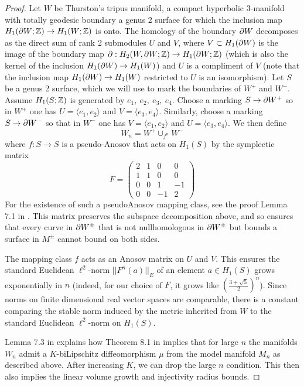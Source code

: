 \begin{proof}
Let $W$ be Thurston’s tripus manifold, a compact hyperbolic 3-manifold with totally geodesic boundary a genus 2 surface for which the inclusion map $H_1(\partial W;{\mathbb Z})\to H_1(W;{\mathbb Z})$ is onto.
The homology of the boundary $\partial W$ decomposes as the direct sum of rank 2 submodules $U$ and $V$, where $V\subset H_1(\partial W)$ is the image of the boundary map $\partial : H_2(W,\partial W;{\mathbb Z})\to H_1(\partial W;{\mathbb Z})$ (which is also the kernel of the inclusion $H_1(\partial W)\to H_1(W)$) and $U$ is a compliment of $V$ (note that the inclusion map $H_1(\partial W)\to H_1(W)$ restricted to $U$ is an isomorphism).
Let $S$ be a genus 2 surface, which we will use to mark the boundaries of $W^{+}$ and $W^-$. Assume $H_1(S;{\mathbb Z})$ is generated by $e_1,~e_2,~e_3,~e_4$. Choose a marking $S\to \partial W^+$ so in $W^+$ one has $U = \langle e_1,e_2\rangle $ and $V = \langle e_3, e_4\rangle$.
Similarly, choose a marking $S\to \partial W^-$ so that in $W^-$ one has $V = \langle e_1,e_2\rangle $ and $U = \langle e_3, e_4\rangle$. We then define $$W_n = W^+\cup_{f^n}W^-$$ where $f:S\to S$ is a pseudo-Anosov that acts on $H_1(S)$ by the symplectic matrix\[ F = \begin{pmatrix}
 2 &  1 & 0 & 0 \\
 1 & 1 & 0 & 0 \\
 0 & 0 & 1 & -1\\
 0 & 0 & -1 & 2
\end{pmatrix} \] For the existence of such a pseudoAnosov mapping class, see the proof Lemma 7.1 in \cite{BD}. This matrix preserves the subspace decomposition above, and so ensures that every curve in $\partial W^{\pm}$ that is not nullhomologous in $\partial W^{\pm}$ but bounds a surface in $M^{\pm}$ cannot bound on both sides.

The mapping class $f$ acts as an Anosov matrix on $U$ and $V$. This ensures the standard Euclidean $\ell^2$-norm $||F^n(a)||_E$ of an element $a\in H_1(S)$ grows exponentially in $n$ (indeed, for our choice of $F$, it grows like $(\frac{3+\sqrt{5}}{2})^n$). Since norms on finite dimensional real vector spaces are comparable, there is a constant comparing the stable norm induced by the metric inherited from $W$ to the standard Euclidean $\ell^2$-norm on $H_1(S)$.

Lemma 7.3 in \cite{BD} explains how Theorem 8.1 in \cite{BMNS} implies that for large $n$ the manifolds $W_n$ admit a $K$-biLipschitz diffeomorphism $\mu$ from the model manifold $ M_n$ as described above. After increasing $K$, we can drop the large $n$ condition. This then also implies the linear volume growth and injectivity radius bounds.
\end{proof}

